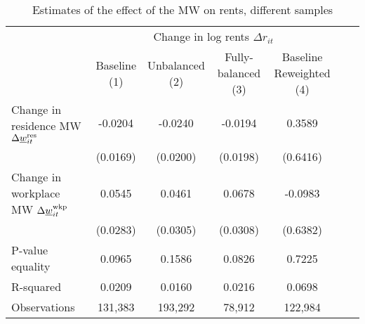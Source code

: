 \begin{table}[hbt!]
    \caption{Estimates of the effect of the MW on rents, different samples}
    \label{tab:static_sample}

    \begin{tabular}{@{}lcccccc@{}}
        \toprule
                                             & \multicolumn{4}{c}{Change in log rents $\Delta r_{it}$}                   \\ \cmidrule(l){2-5} 
                                             & \shortstack{Baseline\\(1)}       & \shortstack{Unbalanced\\(2)}     
                                             & \shortstack{Fully-balanced\\(3)} & \shortstack{Baseline\\Reweighted (4)}  \\ \midrule
        Change in residence MW 
                  $\Delta\underline{w}_{it}^{\text{res}}$    & -0.0204      & -0.0240        & -0.0194       & 0.3589               \\
                                             & (0.0169)    & (0.0200)      & (0.0198)     & (0.6416)              \\
        Change in workplace MW 
                   $\Delta\underline{w}_{it}^{\text{wkp}}$   & 0.0545      & 0.0461        & 0.0678       & -0.0983               \\
                                             & (0.0283)    & (0.0305)      & (0.0308)     & (0.6382)              \\ \midrule
        P-value equality                     & 0.0965      & 0.1586        & 0.0826       & 0.7225               \\
        R-squared                            & 0.0209      & 0.0160        & 0.0216       & 0.0698               \\
        Observations                         & 131,383     & 193,292       & 78,912      & 122,984             \\ \bottomrule
    \end{tabular}


\end{table}
